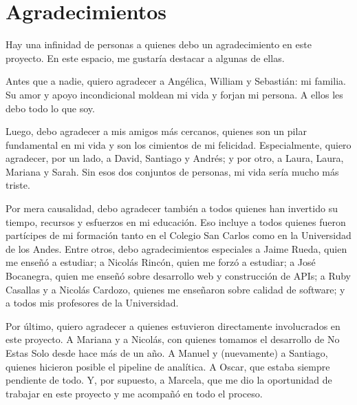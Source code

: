 \chapter*{Agradecimientos}

Hay una infinidad de personas a quienes debo un agradecimiento en este proyecto. En este espacio, me gustaría destacar a algunas de ellas.

Antes que a nadie, quiero agradecer a Angélica, William y Sebastián: mi familia. Su amor y apoyo incondicional moldean mi vida y forjan mi persona. A ellos les debo todo lo que soy.

Luego, debo agradecer a mis amigos más cercanos, quienes son un pilar fundamental en mi vida y son los cimientos de mi felicidad. Especialmente, quiero agradecer, por un lado, a David, Santiago y Andrés; y por otro, a Laura, Laura, Mariana y Sarah. Sin esos dos conjuntos de personas, mi vida sería mucho más triste.

Por mera causalidad, debo agradecer también a todos quienes han invertido su tiempo, recursos y esfuerzos en mi educación. Eso incluye a todos quienes fueron partícipes de mi formación tanto en el Colegio San Carlos como en la Universidad de los Andes. Entre otros, debo agradecimientos especiales a Jaime Rueda, quien me enseñó a estudiar; a Nicolás Rincón, quien me forzó a estudiar; a José Bocanegra, quien me enseñó sobre desarrollo web y construcción de APIs; a Ruby Casallas y a Nicolás Cardozo, quienes me enseñaron sobre calidad de software; y a todos mis profesores de la Universidad.

Por último, quiero agradecer a quienes estuvieron directamente involucrados en este proyecto. A Mariana y a Nicolás, con quienes tomamos el desarrollo de No Estas Solo desde hace más de un año. A Manuel y (nuevamente) a Santiago, quienes hicieron posible el pipeline de analítica. A Oscar, que estaba siempre pendiente de todo. Y, por supuesto, a Marcela, que me dio la oportunidad de trabajar en este proyecto y me acompañó en todo el proceso.
